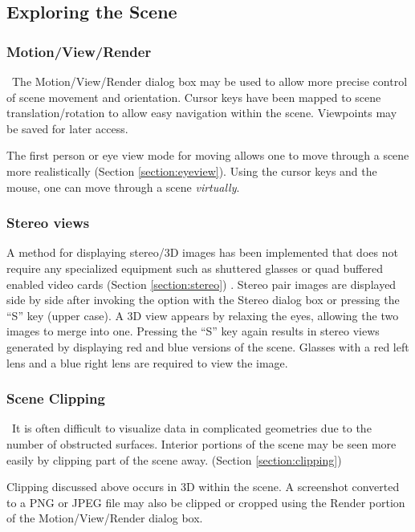 \documentclass[11pt,twoside]{book}
\begin{document}
\subsection{Exploring the Scene}

\subsubsection{Motion/View/Render}\ The Motion/View/Render dialog box may be used to
allow more precise control of scene movement and orientation.
Cursor keys have been mapped to scene translation/rotation to
allow easy navigation within the scene.  Viewpoints may be saved for later access.

The first person or eye view mode for moving
allows one to move through a scene more
realistically (Section \ref{section:eyeview}).  Using the cursor keys and the
mouse, one can move through a scene {\em virtually}.

\subsubsection{Stereo views}A method for displaying stereo/3D
images has been implemented that does
not require any specialized equipment such as shuttered glasses or
quad buffered enabled video cards (Section \ref{section:stereo}) .
Stereo pair images are displayed side by side after invoking the option with
the Stereo dialog box or pressing the ``S'' key (upper case).
A 3D view appears by relaxing the eyes, allowing the two images to merge into one.
Pressing the ``S'' key again results in stereo views generated by
displaying red and blue versions of the scene.
Glasses with a red left lens and a blue right lens are required to view the image.

\subsubsection{Scene Clipping}\ It is often difficult to visualize data
in complicated geometries due to the number of obstructed
surfaces. Interior portions of the scene may be seen more easily
by clipping part of the scene away. (Section
\ref{section:clipping})

Clipping discussed above occurs in 3D within the scene.  A
screenshot converted to a PNG or JPEG file may also be clipped or
cropped using the Render portion of the Motion/View/Render
dialog box.
\end{document}
